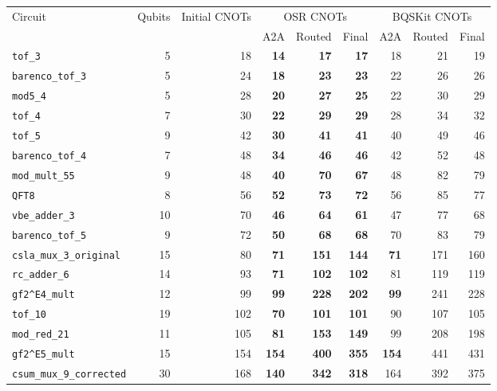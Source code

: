 \begin{table}[p]
\centering
\scriptsize
\begin{tabular}{lrr|rrr|rrr}
\hline
Circuit & Qubits & Initial CNOTs & \multicolumn{3}{c|}{OSR CNOTs} & \multicolumn{3}{c}{BQSKit CNOTs} \\
 & & & A2A & Routed & Final & A2A & Routed & Final \\
\hline
\texttt{tof\_3} & 5 & 18 & \textbf{14} & \textbf{17} & \textbf{17} & 18 & 21 & 19 \\
\texttt{barenco\_tof\_3} & 5 & 24 & \textbf{18} & \textbf{23} & \textbf{23} & 22 & 26 & 26 \\
\texttt{mod5\_4} & 5 & 28 & \textbf{20} & \textbf{27} & \textbf{25} & 22 & 30 & 29 \\
\texttt{tof\_4} & 7 & 30 & \textbf{22} & \textbf{29} & \textbf{29} & 28 & 34 & 32 \\
\texttt{tof\_5} & 9 & 42 & \textbf{30} & \textbf{41} & \textbf{41} & 40 & 49 & 46 \\
\texttt{barenco\_tof\_4} & 7 & 48 & \textbf{34} & \textbf{46} & \textbf{46} & 42 & 52 & 48 \\
\texttt{mod\_mult\_55} & 9 & 48 & \textbf{40} & \textbf{70} & \textbf{67} & 48 & 82 & 79 \\
\texttt{QFT8} & 8 & 56 & \textbf{52} & \textbf{73} & \textbf{72} & 56 & 85 & 77 \\
\texttt{vbe\_adder\_3} & 10 & 70 & \textbf{46} & \textbf{64} & \textbf{61} & 47 & 77 & 68 \\
\texttt{barenco\_tof\_5} & 9 & 72 & \textbf{50} & \textbf{68} & \textbf{68} & 70 & 83 & 79 \\
\texttt{csla\_mux\_3\_original} & 15 & 80 & \textbf{71} & \textbf{151} & \textbf{144} & \textbf{71} & 171 & 160 \\
\texttt{rc\_adder\_6} & 14 & 93 & \textbf{71} & \textbf{102} & \textbf{102} & 81 & 119 & 119 \\
\texttt{gf2\textasciicircum{}E4\_mult} & 12 & 99 & \textbf{99} & \textbf{228} & \textbf{202} & \textbf{99} & 241 & 228 \\
\texttt{tof\_10} & 19 & 102 & \textbf{70} & \textbf{101} & \textbf{101} & 90 & 107 & 105 \\
\texttt{mod\_red\_21} & 11 & 105 & \textbf{81} & \textbf{153} & \textbf{149} & 99 & 208 & 198 \\
\texttt{gf2\textasciicircum{}E5\_mult} & 15 & 154 & \textbf{154} & \textbf{400} & \textbf{355} & \textbf{154} & 441 & 431 \\
\texttt{csum\_mux\_9\_corrected} & 30 & 168 & \textbf{140} & \textbf{342} & \textbf{318} & 164 & 392 & 375 \\

\end{tabular}
\end{table}
